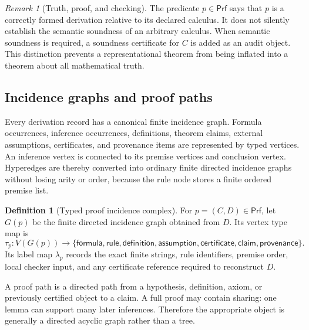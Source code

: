 \documentclass[11pt]{article}
\newcommand{\Prf}{\mathsf{Prf}}
\theoremstyle{plain}
\theoremstyle{definition}
\newtheorem{definition}[theorem]{Definition}
\theoremstyle{remark}
\newtheorem{remark}[theorem]{Remark}
\begin{document}
\begin{remark}[Truth, proof, and checking]
\label{rem:truth-proof}
The predicate $p\in\Prf$ says that $p$ is a correctly formed derivation relative to its declared calculus.  It does not silently establish the semantic soundness of an arbitrary calculus.  When semantic soundness is required, a soundness certificate for $C$ is added as an audit object.  This distinction prevents a representational theorem from being inflated into a theorem about all mathematical truth.
\end{remark}

\subsection{Incidence graphs and proof paths}

Every derivation record has a canonical finite incidence graph.  Formula occurrences, inference occurrences, definitions, theorem claims, external assumptions, certificates, and provenance items are represented by typed vertices.  An inference vertex is connected to its premise vertices and conclusion vertex.  Hyperedges are thereby converted into ordinary finite directed incidence graphs without losing arity or order, because the rule node stores a finite ordered premise list.

\begin{definition}[Typed proof incidence complex]
\label{def:complex}
For $p=(C,D)\in\Prf$, let $G(p)$ be the finite directed incidence graph obtained from $D$.  Its vertex type map is
\[
  \tau_p:V(G(p))\to
  \{\mathsf{formula},\mathsf{rule},\mathsf{definition},\mathsf{assumption},\mathsf{certificate},\mathsf{claim},\mathsf{provenance}\}.
\]
Its label map $\lambda_p$ records the exact finite strings, rule identifiers, premise order, local checker input, and any certificate reference required to reconstruct $D$.
\end{definition}

A proof path is a directed path from a hypothesis, definition, axiom, or previously certified object to a claim.  A full proof may contain sharing: one lemma can support many later inferences.  Therefore the appropriate object is generally a directed acyclic graph rather than a tree.
\end{document}
